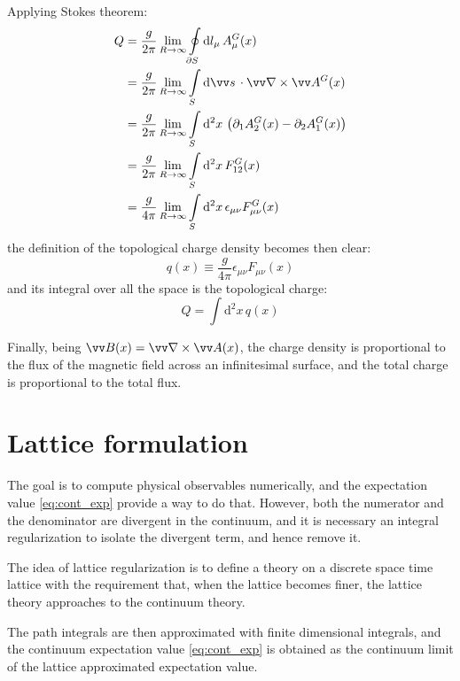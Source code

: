 Applying Stokes theorem:
\begin{align*}
    Q &= \frac{g}{2\pi}\lim_{R\to\infty}\oint\limits_{\partial S}\mathrm dl_\mu\,A^G_\mu(x) \\
      &= \frac{g}{2\pi}\lim_{R\to\infty}\int\limits_S\mathrm d\vv s\,\cdot \vv\nabla \times \vv A^G(x) \\
      &= \frac{g}{2\pi}\lim_{R\to\infty}\int\limits_S\mathrm d^2x\, \left(\partial_1 A^G_2(x) - \partial_2 A^G_1(x)\right) \\
      &= \frac{g}{2\pi}\lim_{R\to\infty}\int\limits_S\mathrm d^2x\, F^G_{12}(x) \\
      &= \frac{g}{4\pi}\lim_{R\to\infty}\int\limits_S\mathrm d^2x\, \epsilon_{\mu\nu}F^G_{\mu\nu}(x)
\end{align*}
the definition of the topological charge density becomes then clear:
\begin{equation}\label{eq:top_charge_density}
    q(x) \equiv \frac{g}{4\pi}\epsilon_{\mu\nu}F_{\mu\nu}(x)
\end{equation}
and its integral over all the space is the topological charge:
\begin{equation}\label{eq:top_charge}
    Q = \int\mathrm d^2x\,q(x)
\end{equation}

Finally, being $\vv B(x) = \vv\nabla \times \vv A(x)$, the charge density is proportional to the flux of the magnetic field across an infinitesimal surface,
and the total charge is proportional to the total flux.

\section{Lattice formulation}
The goal is to compute physical observables numerically, and the expectation value \eqref{eq:cont_exp} provide a way to do that.
However, both the numerator and the denominator are divergent in the continuum, and it is necessary an integral regularization to isolate the divergent term,
and hence remove it.

The idea of lattice regularization is to define a theory on a discrete space time lattice with the requirement that,
when the lattice becomes finer, the lattice theory approaches to the continuum theory.

The path integrals are then approximated with finite dimensional integrals,
and the continuum expectation value \eqref{eq:cont_exp} is obtained as the continuum limit of the lattice approximated expectation value.

